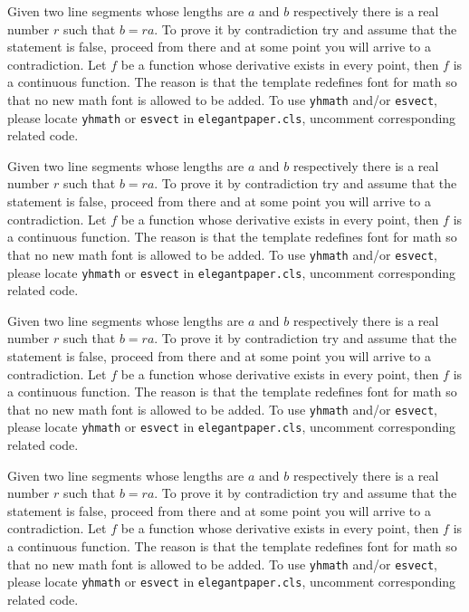 \documentclass[11pt,en,cite=authoryear]{elegantpaper}
\begin{document}
\begin{mdframed}[style=background]
  Given two line segments whose lengths are \(a\) and \(b\) respectively there is a 
  real number \(r\) such that \(b=ra\).
  To prove it by contradiction try and assume that the statement is false,
  proceed from there and at some point you will arrive to a contradiction.
  Let \(f\) be a function whose derivative exists in every point, then \(f\) 
  is a continuous function.
  The reason is that the template redefines font for math so that no new math font is allowed to be added. To use \lstinline{yhmath} and/or \lstinline{esvect}, please locate \lstinline{yhmath} or \lstinline{esvect} in \lstinline{elegantpaper.cls}, uncomment corresponding related code.
\end{mdframed}
\begin{mdframed}[style=important]
    Given two line segments whose lengths are \(a\) and \(b\) respectively there is a 
    real number \(r\) such that \(b=ra\).
    To prove it by contradiction try and assume that the statement is false,
    proceed from there and at some point you will arrive to a contradiction.
    Let \(f\) be a function whose derivative exists in every point, then \(f\) 
    is a continuous function.
    The reason is that the template redefines font for math so that no new math font is allowed to be added. To use \lstinline{yhmath} and/or \lstinline{esvect}, please locate \lstinline{yhmath} or \lstinline{esvect} in \lstinline{elegantpaper.cls}, uncomment corresponding related code.
\end{mdframed}

\begin{mdframed}[style=warn]
  Given two line segments whose lengths are \(a\) and \(b\) respectively there is a 
  real number \(r\) such that \(b=ra\).
  To prove it by contradiction try and assume that the statement is false,
  proceed from there and at some point you will arrive to a contradiction.
  Let \(f\) be a function whose derivative exists in every point, then \(f\) 
  is a continuous function.
  The reason is that the template redefines font for math so that no new math font is allowed to be added. To use \lstinline{yhmath} and/or \lstinline{esvect}, please locate \lstinline{yhmath} or \lstinline{esvect} in \lstinline{elegantpaper.cls}, uncomment corresponding related code.
\end{mdframed}


\begin{mdframed}[style=info]
    Given two line segments whose lengths are \(a\) and \(b\) respectively there is a 
    real number \(r\) such that \(b=ra\).
    To prove it by contradiction try and assume that the statement is false,
    proceed from there and at some point you will arrive to a contradiction.
    Let \(f\) be a function whose derivative exists in every point, then \(f\) 
    is a continuous function.
    The reason is that the template redefines font for math so that no new math font is allowed to be added. To use \lstinline{yhmath} and/or \lstinline{esvect}, please locate \lstinline{yhmath} or \lstinline{esvect} in \lstinline{elegantpaper.cls}, uncomment corresponding related code.
  \end{mdframed}
\end{document}
